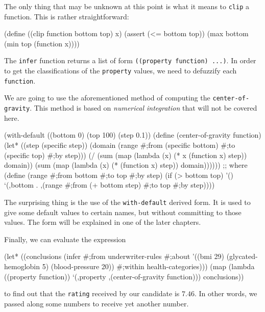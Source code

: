 The only thing that may be unknown at this point is what it means
to \texttt{clip} a function. This is rather straightforward:

\begin{Snippet}
(define ((clip function bottom top) x)
  (assert (<= bottom top))
  (max bottom (min top (function x))))
\end{Snippet}

The \texttt{infer} function returns a list of form
\texttt{((property function) ...)}. In order to get
the classifications of the \texttt{property} values,
we need to defuzzify each \texttt{function}.

We are going to use the aforementioned method of
computing the \texttt{center\--of\--gravity}. This
method is based on \textit{numerical integration}
that will not be covered here.

\begin{Snippet}
(with-default ((bottom 0)
	       (top 100)
	       (step 0.1))
  (define (center-of-gravity function)
    (let* ((step (specific step))
	   (domain (range #;from (specific bottom) 
				#;to (specific top) #;by step)))
      (/ (sum (map (lambda (x) (* x (function x) step)) domain))
	 (sum (map (lambda (x) (* (function x) step)) domain))))))
;; where
(define (range #;from bottom #;to top #;by step)
  (if (> bottom top)
    '()
    `(,bottom . ,(range #;from (+ bottom step) #;to top #;by step))))
\end{Snippet}

The surprising thing is the use of the \texttt{with-default} derived
form. It is used to give some default values to certain names,
but without committing to those values. The form will be explained
in one of the later chapters.

Finally, we can evaluate the expression

\begin{Snippet}
(let* ((conclusions (infer #;from underwriter-rules 
				  #;about '((bmi 29) 
					    (glycated-hemoglobin 5) 
					    (blood-pressure 20))
				  #;within health-categories)))
  (map (lambda ((property function))
	 `(,property ,(center-of-gravity function)))
       conclusions))
\end{Snippet}

to find out that the \texttt{rating} received by our candidate is $7.46$.
In other words, we passed along some numbers to receive yet another number.
